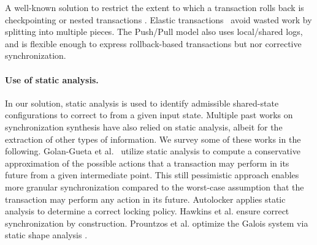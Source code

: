%
A well-known solution to restrict the extent to which a transaction rolls back is checkpointing \cite{spaa08a,Egwutuoha:2013}
or nested transactions \cite{ont,beeri}.
Elastic transactions~\cite{FGG:DISC09} avoid wasted work by splitting into multiple pieces.  
%
The Push/Pull model \cite{KoskinenP15} also uses local/shared logs, and is flexible enough to express rollback-based transactions but nor corrective synchronization.

\paragraph{Use of static analysis.} In our solution, static analysis is used to identify admissible shared-state configurations to correct to from a given input state. Multiple past works on synchronization synthesis have also relied on static analysis, albeit for the extraction of other types of information. We survey some of these works in the following.
%
Golan-Gueta et al.~\cite{GRSY:PLDI13} utilize static analysis to compute a conservative approximation of the possible actions that a transaction may perform in its future from a given intermediate point. This still pessimistic approach enables more granular synchronization compared to the worst-case assumption that the transaction may perform any action in its future.
%
Autolocker \cite{popl/McCloskeyZGB06} applies static analysis to determine a correct locking policy.
%
Hawkins et al. \cite{HawkinsAFRS12}
ensure correct synchronization by construction.
%
Prountzos et al. \cite{PrountzosMPM11} optimize the Galois system \cite{Galois} via static shape analysis \cite{MoolyToplas}.





